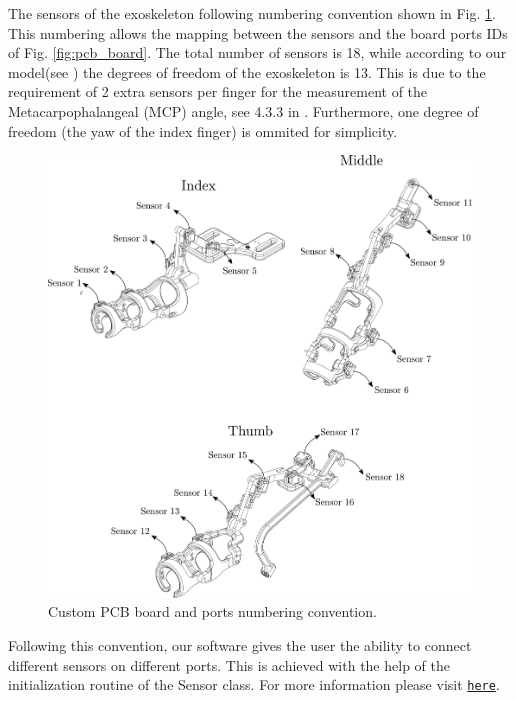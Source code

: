 The sensors of the exoskeleton following numbering convention shown in 
Fig. \ref{fig:sensor_numbers}. This numbering allows the mapping between 
the sensors and the board ports IDs of Fig. \ref{fig:pcb_board}.
The total number of sensors is 18, while according to our model(see 
) the 
degrees of freedom of the exoskeleton is 13. This is 
due to the requirement of 2 extra sensors per finger for 
the measurement of the Metacarpophalangeal (MCP) angle, see 4.3.3 
in \cite{tzemanaki_anthropomorphic_nodate}. Furthermore, one degree of freedom 
(the yaw of the index finger) is ommited for simplicity.

\begin{figure}
    \centering\includegraphics[width=1.0 \linewidth]{Figures/SensorNumbering.pdf}
    \caption{Custom PCB board and ports numbering convention.}
    \label{fig:sensor_numbers}
\end{figure}
Following this convention, our software gives the user the ability to connect
different sensors on different ports. This is achieved with the help of 
the initialization routine of the Sensor class.
For more information please visit 
\texttt{\href{https://amartsop.github.io/Exoskeleton/classSensor.html}{here}}.

